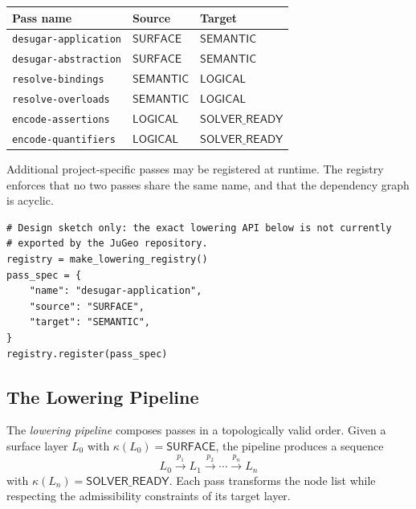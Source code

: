 \documentclass[11pt]{article}
\newcommand{\Surface}{\mathsf{SURFACE}}
\newcommand{\Semantic}{\mathsf{SEMANTIC}}
\newcommand{\Logical}{\mathsf{LOGICAL}}
\newcommand{\SolverReady}{\mathsf{SOLVER\_READY}}
\begin{document}
\begin{center}
\begin{tabular}{l l l}
\hline
\textbf{Pass name} & \textbf{Source} & \textbf{Target} \\
\hline
\texttt{desugar-application}  & $\Surface$  & $\Semantic$ \\
\texttt{desugar-abstraction}  & $\Surface$  & $\Semantic$ \\
\texttt{resolve-bindings}     & $\Semantic$ & $\Logical$ \\
\texttt{resolve-overloads}    & $\Semantic$ & $\Logical$ \\
\texttt{encode-assertions}    & $\Logical$  & $\SolverReady$ \\
\texttt{encode-quantifiers}   & $\Logical$  & $\SolverReady$ \\
\hline
\end{tabular}
\end{center}

Additional project-specific passes may be registered at runtime.  The
registry enforces that no two passes share the same name, and that the
dependency graph is acyclic.

\begin{lstlisting}[style=jugeo-python, caption={Schematic lowering-pass
  construction and registration.}]
# Design sketch only: the exact lowering API below is not currently
# exported by the JuGeo repository.
registry = make_lowering_registry()
pass_spec = {
    "name": "desugar-application",
    "source": "SURFACE",
    "target": "SEMANTIC",
}
registry.register(pass_spec)
\end{lstlisting}

\subsection{The Lowering Pipeline}\label{sec:pipeline}

The \emph{lowering pipeline} composes passes in a topologically valid
order.  Given a surface layer $L_0$ with $\kappa(L_0) = \Surface$, the
pipeline produces a sequence
\[
  L_0 \xrightarrow{p_1} L_1 \xrightarrow{p_2} \cdots
       \xrightarrow{p_n} L_n
\]
with $\kappa(L_n) = \SolverReady$.  Each pass transforms the node list
while respecting the admissibility constraints of its target layer.
\end{document}
